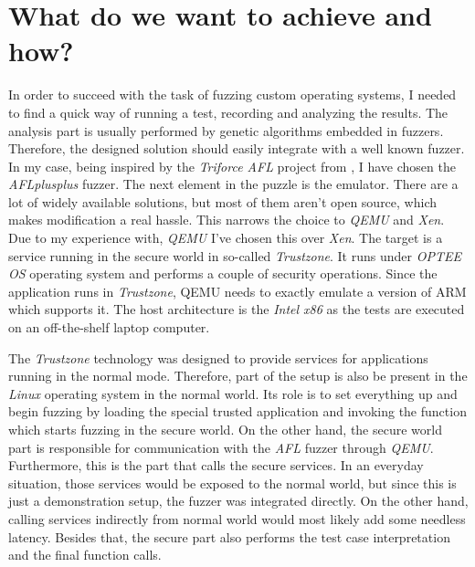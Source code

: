 \cleardoublepage
\section{What do we want to achieve and how?} \label{chap:why}
In order to succeed with the task of fuzzing custom operating systems, I needed to find a quick way of running a test, recording and analyzing the results. The analysis part is usually performed by genetic algorithms embedded in fuzzers. Therefore, the designed solution should easily integrate with a well known fuzzer. In my case, being inspired by the \textit{Triforce AFL} project from \cite{triforceafl}, I have chosen the \textit{AFLplusplus} fuzzer. The next element in the puzzle is the emulator. There are a lot of widely available solutions, but most of them aren't open source, which makes modification a real hassle. This narrows the choice to \textit{QEMU} and \textit{Xen}. Due to my experience with, \textit{QEMU} I've chosen this over \textit{Xen}. The target is a service running in the secure world in so-called \textit{Trustzone}. It runs under \textit{OPTEE OS} operating system and performs a couple of security operations. Since the application runs in \textit{Trustzone}, QEMU needs to exactly emulate a version of ARM which supports it. The host architecture is the \textit{Intel x86} as the tests are executed on an off-the-shelf laptop computer. 

The \textit{Trustzone} technology was designed to provide services for applications running in the normal mode. Therefore, part of the setup is also be present in the \textit{Linux} operating system in the normal world. Its role is to set everything up and begin fuzzing by loading the special trusted application and invoking the function which starts fuzzing in the secure world. On the other hand, the secure world part is responsible for communication with the \textit{AFL} fuzzer through \textit{QEMU}. Furthermore, this is the part that calls the secure services. In an everyday situation, those services would be exposed to the normal world, but since this is just a demonstration setup, the fuzzer was integrated directly. On the other hand, calling services indirectly from normal world would most likely add some needless latency. Besides that, the secure part also performs the test case interpretation and the final function calls. 

